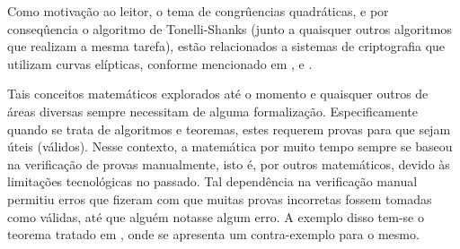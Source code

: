 Como motivação ao leitor, o tema de congrûencias quadráticas, e por conseqûencia o algoritmo de Tonelli-Shanks (junto a quaisquer outros algoritmos que realizam a mesma tarefa), estão relacionados a sistemas de criptografia que utilizam curvas elípticas, conforme mencionado em \cite{PalashSarkar2024AdvancesinMathematicsofCommunications}, \cite{kumar2021algorithm} e \cite{7133812}.




Tais conceitos matemáticos explorados até o momento e quaisquer outros de áreas diversas sempre necessitam de alguma formalização. Especificamente quando se trata de algoritmos e teoremas, estes requerem provas para que sejam úteis (válidos). Nesse contexto, a matemática por muito tempo sempre se baseou na verificação de provas manualmente, isto é, por outros matemáticos, devido às limitações tecnológicas no passado. Tal dependência na verificação manual permitiu erros que fizeram com que muitas provas incorretas fossem tomadas como válidas, até que alguém notasse algum erro.  A exemplo disso tem-se o teorema tratado em \cite{Neeman2002}, onde se apresenta um contra-exemplo para o mesmo.

